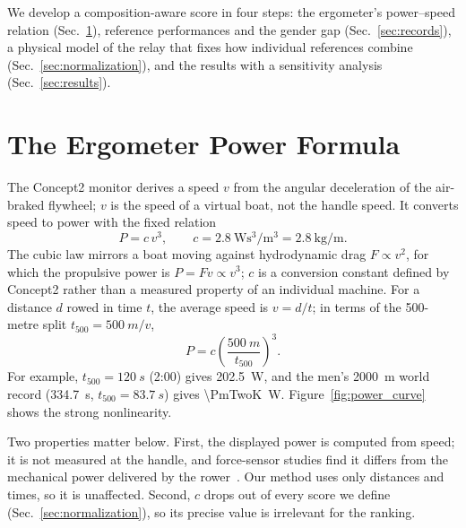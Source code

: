 \documentclass[twocolumn, 10pt]{article}
\begin{document}
We develop a composition-aware score in four steps:
the ergometer's power--speed relation (Sec.~\ref{sec:formula}),
reference performances and the gender gap (Sec.~\ref{sec:records}),
a physical model of the relay that fixes how individual references combine
(Sec.~\ref{sec:normalization}), and
the results with a sensitivity analysis (Sec.~\ref{sec:results}).

\section{The Ergometer Power Formula}
\label{sec:formula}

The Concept2 monitor derives a speed $v$ from the angular deceleration of the
air-braked flywheel; $v$ is the speed of a virtual boat, not the handle speed.
It converts speed to power with the fixed relation~\cite{Concept2manual}
\begin{equation}
  P = c\,v^{3}, \qquad c = \SI{2.8}{\watt\second\cubed\per\metre\cubed}
  = \SI{2.8}{\kilo\gram\per\metre}.
  \label{eq:power}
\end{equation}
The cubic law mirrors a boat moving against hydrodynamic drag
$F\propto v^{2}$, for which the propulsive power is $P=Fv\propto v^{3}$;
$c$ is a conversion constant defined by Concept2 rather than a measured
property of an individual machine.
For a distance $d$ rowed in time $t$, the average speed is $v=d/t$; in terms of
the 500-metre split $t_{500}=\SI{500}{m}/v$,
\begin{equation}
  P = c\left(\frac{\SI{500}{m}}{t_{500}}\right)^{\!3}.
  \label{eq:power_split}
\end{equation}
For example, $t_{500}=\SI{120}{s}$ (2:00) gives \SI{202.5}{W}, and the men's
\SI{2000}{m} world record (\SI{334.7}{s}, $t_{500}=\SI{83.7}{s}$) gives
\SI{\PmTwoK}{W}.
Figure~\ref{fig:power_curve} shows the strong nonlinearity.

Two properties matter below.
First, the displayed power is computed from speed; it is not measured at the
handle, and force-sensor studies find it differs from the mechanical power
delivered by the rower~\cite{Boyas2006}.
Our method uses only distances and times, so it is unaffected.
Second, $c$ drops out of every score we define (Sec.~\ref{sec:normalization}),
so its precise value is irrelevant for the ranking.
\end{document}
